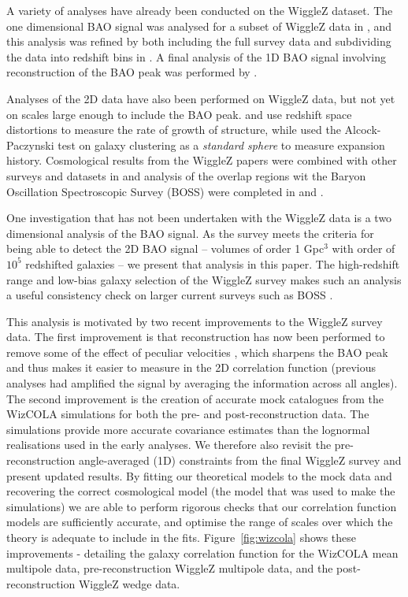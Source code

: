 \documentclass[a4paper,fleqn,usenatbib]{mnras}
\begin{document}
A variety of analyses have already been conducted on the WiggleZ dataset. 
The one dimensional BAO signal was analysed for a subset of WiggleZ data in \citet{BlakeDavis2011}, and this analysis was refined by both including the full survey data and subdividing the data into redshift bins in \citet{BlakeKazin2011}. A final analysis of the 1D BAO signal involving reconstruction of the BAO peak was performed by \citet{KazinKoda2014}. 

Analyses of the 2D data have also been performed on WiggleZ data, but not yet on scales large enough to include the BAO peak.  \citet{BlakeBroughColless2011} and \citet{ContrerasBlake2013} use redshift space distortions to measure the rate of growth  of structure, while \citet{BlakeGlazebrook2011} used the Alcock-Paczynski test on galaxy clustering as a {\em standard sphere} to measure expansion history. Cosmological results from the WiggleZ papers were combined with other surveys and datasets in \citet{Parkinson2012} and analysis of the overlap regions wit the Baryon Oscillation Spectroscopic Survey (BOSS) were completed in \citet{BeutlerBlakeKoda2016} and \citet{MarinBeutlerBlake2016}.

One investigation that has not been undertaken with the WiggleZ data is a two dimensional analysis of the BAO signal.  As the survey meets the criteria for being able to detect the 2D BAO signal -- volumes of order 1 Gpc$^3$ with order of $10^5$ redshifted galaxies \citep{Tegmark1997,BlakeGlazebrook2003,BlakeParkinson2006} -- we present that analysis in this paper. The high-redshift range and low-bias galaxy selection of the WiggleZ survey makes such an analysis a useful consistency check on larger current surveys such as BOSS \citep{AndersonAubourg2014}.

This analysis is motivated by two recent improvements to the WiggleZ survey data.  The first improvement is that reconstruction has now been performed to remove some of the effect of peculiar velocities \citep{KazinKoda2014}, which sharpens the BAO peak and thus makes it  easier to measure in the 2D correlation function (previous analyses had amplified the signal by averaging the information across all angles).  The second improvement is the creation of accurate mock catalogues from the WizCOLA simulations \citep{KodaBlake2015} for both the pre- and post-reconstruction data. The simulations provide more accurate covariance estimates than the lognormal realisations used in the early analyses.  We therefore also revisit the pre-reconstruction angle-averaged (1D) constraints from the final WiggleZ survey and present updated results.  By fitting our theoretical models to the mock data and recovering the correct cosmological model (the model that was used to make the simulations) we are able to perform rigorous checks that our correlation function models are sufficiently accurate, and optimise the range of scales over which the theory is adequate to include in the fits. Figure~\ref{fig:wizcola} shows these improvements - detailing the galaxy correlation function for the WizCOLA mean multipole data, pre-reconstruction WiggleZ multipole data, and the post-reconstruction WiggleZ wedge data.
\end{document}
